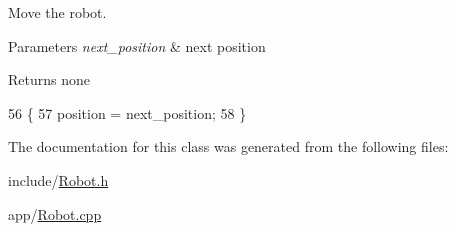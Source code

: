 Move the robot. 


\begin{DoxyParams}{Parameters}
{\em next\+\_\+position} & next position \\
\hline
\end{DoxyParams}
\begin{DoxyReturn}{Returns}
none 
\end{DoxyReturn}

\begin{DoxyCode}
56                                                        \{
57     position = next\_position;
58 \}
\end{DoxyCode}


The documentation for this class was generated from the following files\+:\begin{DoxyCompactItemize}
\item 
include/\hyperlink{Robot_8h}{Robot.\+h}\item 
app/\hyperlink{Robot_8cpp}{Robot.\+cpp}\end{DoxyCompactItemize}

